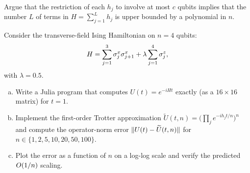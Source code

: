\documentclass[12pt,oneside]{amsart}
\begin{document}
\begin{exercise}\label{ex:local-terms}
  Argue that the restriction of each $h_j$ to involve at most $c$ qubits
  implies that the number $L$ of terms in
  $H = \sum_{j=1}^L h_j$ is upper bounded by a polynomial in $n$.
\end{exercise}

\begin{exercise}\label{ex:trotter-error}
  Consider the transverse-field Ising Hamiltonian on $n=4$ qubits:
  \[
    H = \sum_{j=1}^{3} \sigma^x_j\sigma^x_{j+1}
    + \lambda \sum_{j=1}^4 \sigma^z_j,
  \]
  with $\lambda = 0.5$.
  \begin{enumerate}[(a)]
    \item Write a Julia program that computes $U(t) = e^{-iHt}$ exactly
      (as a $16\times 16$ matrix) for $t=1$.
    \item Implement the first-order Trotter approximation
      $\widetilde{U}(t,n) = \bigl(\prod_{j} e^{-ih_j t/n}\bigr)^n$ and
      compute the operator-norm error
      $\lVert U(t)-\widetilde{U}(t,n) \rVert$ for
      $n \in \{1, 2, 5, 10, 20, 50, 100\}$.
    \item Plot the error as a function of $n$ on a log-log scale and verify
      the predicted $O\!\left(1/n\right)$ scaling.
  \end{enumerate}
\end{exercise}
\end{document}
